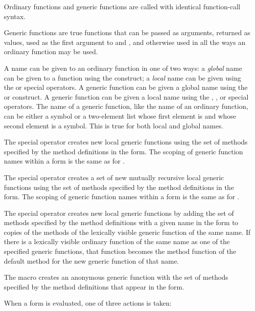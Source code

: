 Ordinary functions and generic functions are called with identical function-call
syntax.
 
Generic functions are true functions that can be passed as arguments, returned as values,
used as the first argument to  and , and otherwise used in all the ways
an ordinary function may be used.

A name can be given to an ordinary function in one of
two ways: a \emph{global\/} name can be given to a function using the
 construct; a \emph{local\/} name can be given using the
 or  special operators.  A generic function can be
given a global name using the  or 
construct.  A generic function can be given a local name using the
, , or 
special operators.  The name of a generic function, like the name of an
ordinary function, can be either a symbol or a two-element list whose
first element is  and whose second element is a symbol.
This is true for both local and global names.

The  special operator creates new local generic
functions using the set of methods specified by the method definitions
in the  form.  The scoping of generic function names
within a  form is the same as for .

The  special operator creates a set of new mutually
recursive local generic functions using the set of methods specified
by the method definitions in the  form.  The
scoping of generic function names within a  form
is the same as for .

The  special operator creates new local generic
functions by adding the set of methods specified by the method
definitions with a given name in the  form to
copies of the methods of the lexically visible generic function of the
same name. If there is a lexically visible ordinary function of the
same name as one of the specified generic functions, that function
becomes the method function of the default method for the new generic
function of that name.

The  macro creates an anonymous generic
function with the set of methods specified by the method definitions that appear
in the  form.

When a  form is evaluated, one of three actions
is taken:

